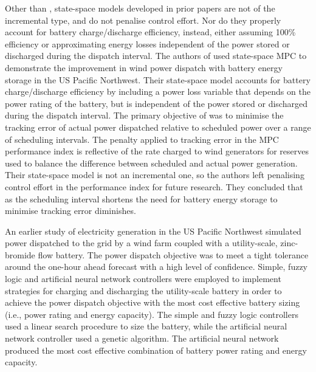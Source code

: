 \documentclass[a4paper, 10pt, twocolumn, preprint, 3p]{elsarticle}
\begin{document}
Other than \cite{TREB16}, state-space models developed in prior papers are not of the incremental type, and do not penalise control effort.  Nor do they properly account for battery charge/discharge efficiency, instead, either assuming 100\% efficiency or approximating energy losses independent of the power stored or discharged during the dispatch interval.  The authors of \cite{HALBB14} used state-space MPC to demonstrate the improvement in wind power dispatch with battery energy storage in the US Pacific Northwest.  Their state-space model accounts for battery charge/discharge efficiency by including a power loss variable that depends on the power rating of the battery, but is independent of the power stored or discharged during the dispatch interval.  The primary objective of \cite{HALBB14} was to minimise the tracking error of actual power dispatched relative to scheduled power over a range of scheduling intervals.  The penalty applied to tracking error in the MPC performance index is reflective of the rate charged to wind generators for reserves used to balance the difference between scheduled and actual power generation.  Their state-space model is not an incremental one, so the authors left penalising control effort in the performance index for future research.  They concluded that as the scheduling interval shortens the need for battery energy storage to minimise tracking error diminishes.

An earlier study \cite{BYJYHH11} of electricity generation in the US Pacific Northwest simulated power dispatched to the grid by a wind farm coupled with a utility-scale, zinc-bromide flow battery.  The power dispatch objective was to meet a tight tolerance around the one-hour ahead forecast with a high level of confidence.  Simple, fuzzy logic and artificial neural network controllers were employed to implement strategies for charging and discharging the utility-scale battery in order to achieve the power dispatch objective with the most cost effective battery sizing (i.e., power rating and energy capacity).  The simple and fuzzy logic controllers used a linear search procedure to size the battery, while the artificial neural network controller used a genetic algorithm.  The artificial neural network produced the most cost effective combination of battery power rating and energy capacity.
\end{document}
